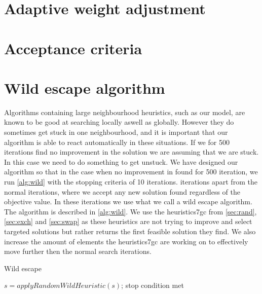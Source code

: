 \documentclass[../main.tex]{subfiles}
\begin{document}
\section{Adaptive weight adjustment}
\label{sec:weight}

\section{Acceptance criteria}
\label{sec:accept}

\section{Wild escape algorithm}
\label{sec:wild}
Algorithms containing large neighbourhood heuristics, such as our model, are known to be good at searching locally aswell as globally. 
However they do sometimes get stuck in one neighbourhood, and it is important that our algorithm is able to react automatically in these situations.
If we for 500 iterations find no improvement in the solution we are assuming that we are stuck. In this case we need to do something to get unstuck. 
We have designed our algorithm so that in the case when no improvement in found for 500 iteration, we run \cref{alg:wild} with the stopping criteria of 10 iterations. iterations apart from the normal iterations, where we accept any new solution found regardless of the objective value. 
In these iterations we use what we call a wild escape algorithm.
The algorithm is described in \cref{alg:wild}.
We use the heuristics7gc from \cref{sec:rand}, \cref{sec:exch} and \cref{sec:swap} as these heuristics are not trying to improve and select targeted solutions but rather returns the first feasible solution they find. 
We also increase the amount of elements the heuristics7gc are working on to effectively move further then the normal search iterations. 

\begin{algorithm}
    \label{alg:wild}
    \caption{Wild escape}
    \begin{algorithmic}[1]
        \Repeat
        \State $s=applyRandomWildHeuristic(s)$;
        \Until stop condition met
        \EndFunction
    \end{algorithmic}
\end{algorithm}

\biblio                                                         
\end{document}
